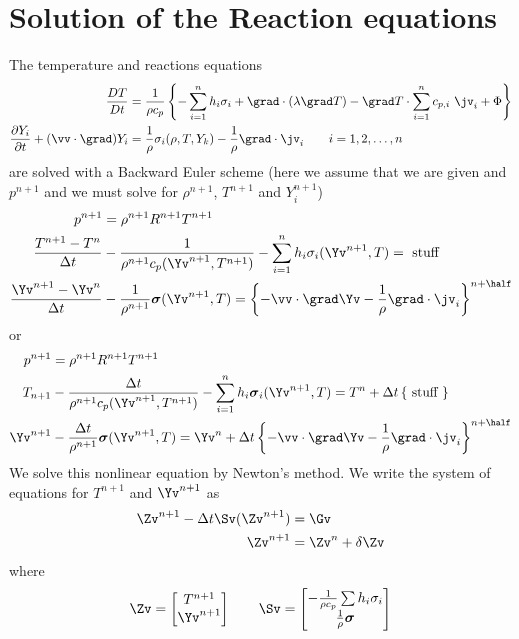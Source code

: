\documentclass[10pt]{article}
\begin{document}
\section{Solution of the Reaction equations}

\newcommand{\dt}{{\Delta t}}
\newcommand{\dY}{{\delta Y}}
\newcommand{\dT}{{\delta T}}

The temperature and reactions equations
\begin{align*}
  {D T\over Dt} & = 
       {1\over \rho c_p}  \left\{ -\sumi h_i\sigma_i + \grad\cdot(\lambda\grad T)
      - \grad T \cdot\sumi c_{p,i} ~ \jv_i
              + \Phi \right\} \\
  {\partial Y_i \over \partial t} + (\vv\cdot\grad) Y_i &= {1\over\rho}{\sigma_i(\rho,T,Y_k) }
               -{1\over\rho}\grad\cdot\jv_i \qquad i=1,2,\ldots,n
\end{align*}
are solved with a Backward Euler scheme (here we assume that we are given and $p^{n+1}$ and we must solve
for $\rho^{n+1}$, $T^{n+1}$ and $Y_i^{n+1}$)
\begin{align*}
  p^{n+1} & = \rho^{n+1} R^{n+1} T^{n+1} \\
  {T^{n+1}-T^n \over \dt} &- {1\over \rho^{n+1} c_p(\Yv^{n+1},T^{n+1})}  -\sumi h_i\sigma_i (\Yv^{n+1},T) =
             \mbox{ stuff }\\
  {\Yv^{n+1}-\Yv^n \over \dt} &- {1\over \rho^{n+1}} \sigmav(\Yv^{n+1},T) = \left\{ -\vv\cdot\grad \Yv 
                    -{1\over\rho}\grad\cdot\jv_i \right\}^{n+\half}
\end{align*}
or
\begin{align*}
  p^{n+1} & = \rho^{n+1} R^{n+1} T^{n+1} \\
  T_{n+1}  &- {\dt\over \rho^{n+1} c_p(\Yv^{n+1},T^{n+1})}  -\sumi h_i\sigmav_i (\Yv^{n+1},T) =
      T^n + \dt\left\{ \mbox{ stuff } \right\} \\ 
  \Yv^{n+1} & - {\dt \over \rho^{n+1}} \sigmav(\Yv^{n+1},T) = \Yv^n +\dt\left\{ -\vv\cdot\grad \Yv
        - {1\over\rho}\grad\cdot\jv_i \right\}^{n+\half}
\end{align*}
We solve this nonlinear equation by Newton's method. 
We write the system of equations for $T^{n+1}$ and $\Yv^{n+1}$ as
\begin{align*}
  \Zv^{n+1} - \dt \Sv(\Zv^{n+1}) & = \Gv \\
  \Zv^{n+1} &= \Zv^n + \delta\Zv
\end{align*}
where
\[
  \Zv = \begin{bmatrix} T^{n+1} \\ \Yv^{n+1} \end{bmatrix} \qquad
  \Sv = \begin{bmatrix} -{1\over \rho c_p}  \sum h_i\sigma_i \\
                         {1\over \rho} \sigmav \end{bmatrix}
\]
\end{document}
